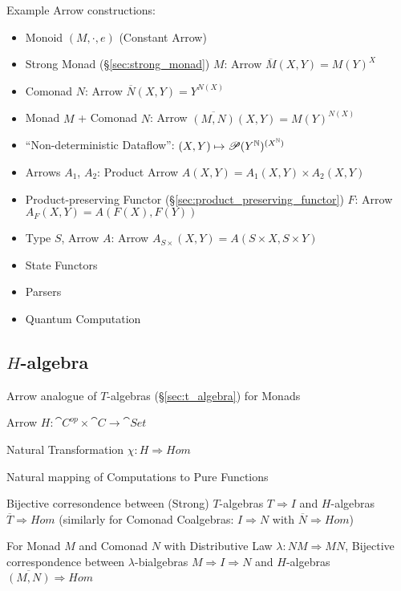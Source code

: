 Example Arrow constructions:
\begin{itemize}
  \item Monoid $(M,\cdot,e)$ (Constant Arrow)
  \item Strong Monad (\S\ref{sec:strong_monad}) $M$: Arrow
    $\overline{M}(X,Y) = M(Y)^X$
  \item Comonad $N$: Arrow $\overline{N}(X,Y) = Y^{N(X)}$
  \item Monad $M$ + Comonad $N$: Arrow
    $\overline{(M,N)}(X,Y) = M(Y)^{N(X)}$
  \item ``Non-deterministic Dataflow'':
    $(X,Y) \mapsto \mathscr{P}(Y^{\mathbb{N}})^{(X^{\mathbb{N}})}$
  \item Arrows $A_1$, $A_2$: Product Arrow
    $A(X,Y) = A_1(X,Y) \times A_2(X,Y)$
  \item Product-preserving Functor
    (\S\ref{sec:product_preserving_functor}) $F$: Arrow
    $A_F(X,Y) = A(F(X),F(Y))$
  \item Type $S$, Arrow $A$: Arrow
    $A_{S\times}(X,Y) = A(S \times X, S \times Y)$
  \item State Functors
  \item Parsers
  \item Quantum Computation
\end{itemize}
\cite{jacobs-heunen-hasuo09}



\subsection{$H$-algebra}\label{sec:h_algebra}
\cite{jacobs-heunen-hasuo09}


Arrow analogue of $T$-algebras (\S\ref{sec:t_algebra}) for Monads

Arrow $H : \cat{C}^{op} \times \cat{C} \rightarrow \cat{Set}$

Natural Transformation $\chi : H \Rightarrow Hom$

Natural mapping of Computations to Pure Functions

Bijective corresondence between (Strong) $T$-algebras $T \Rightarrow
I$ and $H$-algebras $\overline{T} \Rightarrow Hom$ (similarly for
Comonad Coalgebras: $I \Rightarrow N$ with $\overline{N} \Rightarrow
Hom$)

For Monad $M$ and Comonad $N$ with Distributive Law $\lambda : N M
\Rightarrow M N$, Bijective correspondence between
$\lambda$-bialgebras $M \Rightarrow I \Rightarrow N$ and $H$-algebras
$\overline{(M,N)} \Rightarrow Hom$

